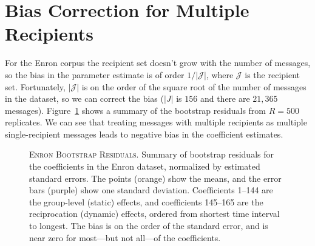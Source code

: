 \documentclass[aoas,preprint]{imsart}
\begin{document}
%
%        
%        

\section{Bias Correction for Multiple Recipients}\label{S:bias-correction}



For the Enron corpus the recipient set doesn't grow with the number
of messages, so the bias in the parameter estimate is of order
$1/|\mathcal{J}|$, where $\mathcal{J}$ is the recipient set.  Fortunately,
$|\mathcal{J}|$ is on the order of the square root of the number of messages
in the dataset, so we can correct the bias ($|J|$ is $156$ and there are
$21,365$ messages).  Figure~\ref{F:boot-resid} shows a summary of the bootstrap
residuals from $R = 500$ replicates.  We can see that treating messages with
multiple recipients as multiple single-recipient messages leads to negative
bias in the coefficient estimates.

\begin{figure}
    \caption{
        \textsc{Enron Bootstrap Residuals.} Summary of bootstrap residuals for
        the coefficients in the Enron dataset, normalized by estimated
        standard errors.  The points (orange) show the means, and the
        error bars (purple) show one standard deviation.  Coefficients
        1--144 are the group-level (static) effects, and coefficients
        145--165 are the reciprocation (dynamic) effects, ordered from
        shortest time interval to longest.  The bias is on the order of
        the standard error, and is near zero for most---but not all---of the
        coefficients.
    }
    \label{F:boot-resid}
\end{figure}
\end{document}
